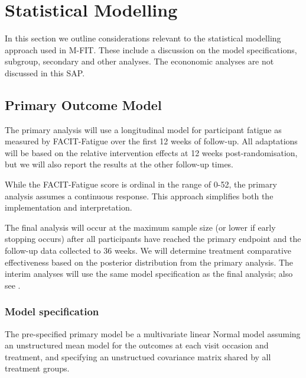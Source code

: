\documentclass[11pt,parskip=half-]{scrartcl}
\begin{document}
\clearpage

\section{Statistical Modelling}\label{statistical-modelling}

In this section we outline considerations relevant to the statistical modelling approach used in M-FIT. These include a discussion on the model specifications, subgroup, secondary and other analyses. The econonomic analyses are not discussed in this SAP.

\subsection{Primary Outcome Model}\label{primary-model}

The primary analysis will use a longitudinal model for participant fatigue as measured by FACIT-Fatigue over the first 12 weeks of follow-up. All adaptations will be based on the relative intervention effects at 12 weeks post-randomisation, but we will also report the results at the other follow-up times.

While the FACIT-Fatigue score is ordinal in the range of 0-52, the primary analysis assumes a continuous response. This approach simplifies both the implementation and interpretation.

The final analysis will occur at the maximum sample size (or lower if early stopping occurs) after all participants have reached the primary endpoint and the follow-up data collected to 36 weeks. We will determine treatment comparative effectiveness based on the posterior distribution from the primary analysis. The interim analyses will use the same model specification as the final analysis; also see .

\subsubsection{Model specification}\label{model-specification}

The pre-specified primary model  be a multivariate linear Normal model assuming an unstructured mean model for the outcomes at each visit occasion and treatment, and specifying an unstructued covariance matrix shared by all treatment groups.
\end{document}
